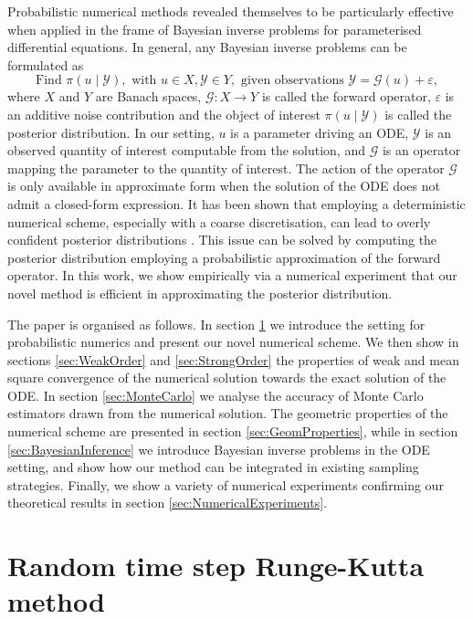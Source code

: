 \documentclass{siamart1116}
\numberwithin{theorem}{section}
\newcommand{\epl}{\varepsilon}
\begin{document}
Probabilistic numerical methods revealed themselves to be particularly effective when applied in the frame of Bayesian inverse problems for parameterised differential equations. In general, any Bayesian inverse problems can be formulated as 
\begin{equation*}
	\text{Find } \pi(u\mid \mathcal{Y}), \text{ with } u \in X, \mathcal{Y} \in Y, \text{ given observations } \mathcal{Y} = \mathcal{G}(u) + \epl,
\end{equation*}
where $X$ and $Y$ are Banach spaces, $\mathcal{G}\colon X \to Y$ is called the forward operator, $\epl$ is an additive noise contribution and the object of interest $\pi(u\mid\mathcal{Y})$ is called the posterior distribution. In our setting, $u$ is a parameter driving an ODE, $\mathcal{Y}$ is an observed quantity of interest computable from the solution, and $\mathcal{G}$ is an operator mapping the parameter to the quantity of interest. The action of the operator $\mathcal{G}$ is only available in approximate form when the solution of the ODE does not admit a closed-form expression. It has been shown that employing a deterministic numerical scheme, especially with a coarse discretisation, can lead to overly confident posterior distributions \cite{CGS16,COS17}. This issue can be solved by computing the posterior distribution employing a probabilistic approximation of the forward operator. In this work, we show empirically via a numerical experiment that our novel method is efficient in approximating the posterior distribution.

The paper is organised as follows. In section \ref{sec:MethodIntro} we introduce the setting for probabilistic numerics and present our novel numerical scheme. We then show in sections \ref{sec:WeakOrder} and \ref{sec:StrongOrder} the properties of weak and mean square convergence of the numerical solution towards the exact solution of the ODE. In section \ref{sec:MonteCarlo} we analyse the accuracy of Monte Carlo estimators drawn from the numerical solution. The geometric properties of the numerical scheme are presented in section \ref{sec:GeomProperties}, while in section \ref{sec:BayesianInference} we introduce Bayesian inverse problems in the ODE setting, and show how our method can be integrated in existing sampling strategies. Finally, we show a variety of numerical experiments confirming our theoretical results in section \ref{sec:NumericalExperiments}.



\section{Random time step Runge-Kutta method}\label{sec:MethodIntro}
\end{document}
